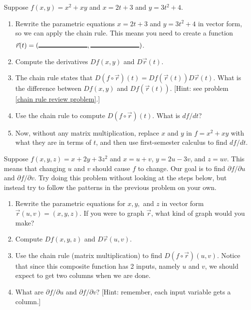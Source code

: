 \begin{problem}%
 Suppose $f(x,y) = x^2+xy$ and $x=2t+3$ and $y=3t^2+4$.
 \begin{enumerate}
  \item Rewrite the parametric equations $x=2t+3$ and $y=3t^2+4$ in vector form, so we can apply the chain rule. This means you need to create a function $\vec r(t) = (\blank{1in}, \blank{1in})$.
  \item Compute the derivatives $Df(x,y)$ and $D\vec r(t)$. 
  \item The chain rule states that $D(f\circ \vec r)(t) = Df(\vec r(t))D\vec r(t)$. What is the difference between $Df(x,y)$ and $Df(\vec r(t))$. [Hint: see problem \ref{chain rule review problem}.]
  \item Use the chain rule to compute $D(f\circ \vec r)(t)$. What is $df/dt$?
  \item Now, without any matrix multiplication, replace $x$ and $y$ in $f=x^2+xy$ with what they are in terms of $t$, and then use first-semester calculus to find $df/dt$.
 \end{enumerate}
\end{problem}

\begin{problem}%
 Suppose $f(x,y,z) = x+2y+3z^2$ and $x=u+v$, $y=2u-3v$, and $z=uv$.  This means that changing $u$ and $v$ should cause $f$ to change. Our goal is to find $\partial f/\partial u$ and $\partial f/\partial v$. Try doing this problem without looking at the steps below, but instead try to follow the patterns in the previous problem on your own. 
 \begin{enumerate}
  \item Rewrite the parametric equations for $x,y,$ and $z$ in vector form $\vec r(u,v)=(x,y,z)$. If you were to graph $\vec r$, what kind of graph would you make?
  \item Compute $Df(x,y,z)$ and $D\vec r(u,v)$.  
  \item Use the chain rule (matrix multiplication) to find $D(f\circ \vec r)(u,v)$.  Notice that since this composite function has 2 inputs, namely $u$ and $v$, we should expect to get two columns when we are done.
  \item What are $\partial f/\partial u$ and $\partial f/\partial v$? [Hint: remember, each input variable gets a column.]
 \end{enumerate}
\end{problem}


